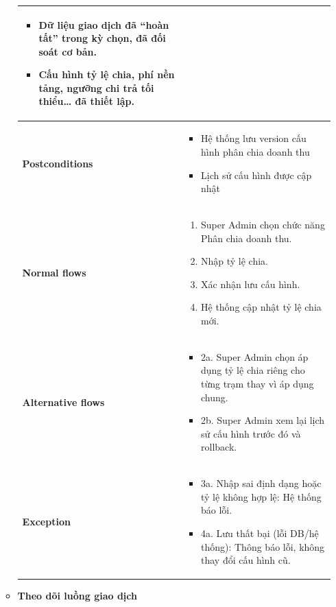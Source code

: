 \begin{enumerate}[label=\textbf{\alph*)}]
\begin{itemize}
\begin{center}
\begin{longtable}{|m{}|m{}|}
\begin{itemize}
            \item Dữ liệu giao dịch đã “hoàn tất” trong kỳ chọn, đã đối soát cơ bản.
            \item Cấu hình tỷ lệ chia, phí nền tảng, ngưỡng chi trả tối thiểu… đã thiết lập.
          \end{itemize}\\
          \hline
          \textbf{Postconditions} &
          \begin{itemize}
            \item Hệ thống lưu version cấu hình phân chia doanh thu
            \item Lịch sử cấu hình được cập nhật
          \end{itemize}\\
          \hline
          \textbf{Normal flows} &
          \begin{enumerate}[label=\arabic*.]
            \item Super Admin chọn chức năng Phân chia doanh thu.
            \item Nhập tỷ lệ chia.
            \item Xác nhận lưu cấu hình.
            \item Hệ thống cập nhật tỷ lệ chia mới.
          \end{enumerate}\\
          \hline
          \textbf{Alternative flows} &
          \begin{itemize}
            \item 2a. Super Admin chọn áp dụng tỷ lệ chia riêng cho từng trạm thay vì áp dụng chung.
            \item 2b. Super Admin xem lại lịch sử cấu hình trước đó và rollback.
          \end{itemize}\\
          \hline
          \textbf{Exception} &
          \begin{itemize}
            \item 3a. Nhập sai định dạng hoặc tỷ lệ không hợp lệ: Hệ thống báo lỗi.
            \item 4a. Lưu thất bại (lỗi DB/hệ thống): Thông báo lỗi, không thay đổi cấu hình cũ.
          \end{itemize}\\
          \hline
          \end{longtable}
      \end{center}
    \item \textbf{Theo dõi luồng giao dịch}

\end{itemize}
\end{enumerate}
